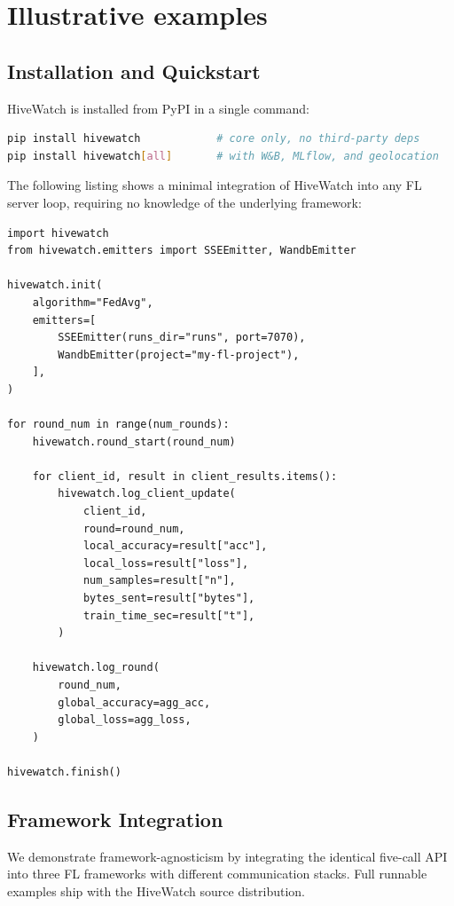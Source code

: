 \documentclass[preprint,12pt, a4paper]{elsarticle}
\begin{document}
\section{Illustrative examples}
\label{sec:illustrative}

\subsection{Installation and Quickstart}

HiveWatch is installed from PyPI in a single command:

\begin{lstlisting}[style=PythonStyle,language=bash,caption={Installation.}]
pip install hivewatch            # core only, no third-party deps
pip install hivewatch[all]       # with W&B, MLflow, and geolocation
\end{lstlisting}

The following listing shows a minimal integration of HiveWatch into any FL server loop, requiring no knowledge of the underlying framework:

\begin{lstlisting}[style=PythonStyle,caption={Minimal HiveWatch integration.}]
import hivewatch
from hivewatch.emitters import SSEEmitter, WandbEmitter

hivewatch.init(
    algorithm="FedAvg",
    emitters=[
        SSEEmitter(runs_dir="runs", port=7070),
        WandbEmitter(project="my-fl-project"),
    ],
)

for round_num in range(num_rounds):
    hivewatch.round_start(round_num)

    for client_id, result in client_results.items():
        hivewatch.log_client_update(
            client_id,
            round=round_num,
            local_accuracy=result["acc"],
            local_loss=result["loss"],
            num_samples=result["n"],
            bytes_sent=result["bytes"],
            train_time_sec=result["t"],
        )

    hivewatch.log_round(
        round_num,
        global_accuracy=agg_acc,
        global_loss=agg_loss,
    )

hivewatch.finish()
\end{lstlisting}

\subsection{Framework Integration}

We demonstrate framework-agnosticism by integrating the identical five-call API into three FL frameworks with different communication stacks. Full runnable examples ship with the HiveWatch source distribution.
\end{document}
